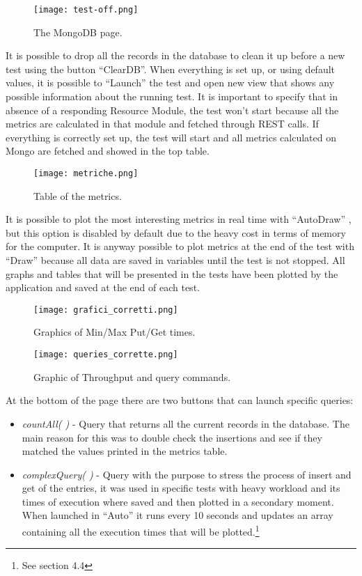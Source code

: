 \begin{figure}[H]
\texttt{[image: test-off.png]}
\centering
\caption{The MongoDB page.}
\end{figure}
It is  possible to drop all the records in the database to clean it up before a new test using the button “ClearDB”. When everything is set up, or using default values, it is possible to “Launch” the test and open  new view that shows any possible information about the running test. It is important to specify that in absence of a responding Resource Module, the test won’t start because all the metrics are calculated in that module and fetched through REST calls.
If everything is correctly set up, the test will start and all metrics calculated on Mongo are fetched and showed in the top table.
\begin{figure}[H]
\texttt{[image: metriche.png]}
\centering
\caption{Table of the metrics.}
\end{figure}
It is possible to plot  the most interesting metrics in real time with “AutoDraw”  , but this option is disabled by default due to the heavy cost in terms of memory for the computer. It is anyway possible to plot metrics at the end of the test with “Draw” because all data are saved in variables until the test is not stopped. All graphs and tables that will be presented in the tests have been plotted by the application and saved at the end of each test.
\begin{figure}[H]
\texttt{[image: grafici\_corretti.png]}
\centering
\caption{Graphics of Min/Max Put/Get times.}
\end{figure}
\begin{figure}[H]
\texttt{[image: queries\_corrette.png]}
\centering
\caption{Graphic of Throughput and query commands.}
\end{figure}
At the bottom of the page there are two buttons that can launch specific queries:
\begin{itemize}
	\item \textit{countAll( )} - Query that returns all the current records in the database. The main reason for this was to double check the insertions and see if they matched the values printed in the metrics table.
	\item \textit{complexQuery( )} - Query with the purpose to stress the  process of insert and get of the entries, it was used in specific tests with heavy workload and its times of execution where saved and then plotted in a secondary moment. When launched in “Auto” it runs every 10 seconds and updates an array containing all the execution times that will be plotted.\footnote{See section 4.4}
\end{itemize}



